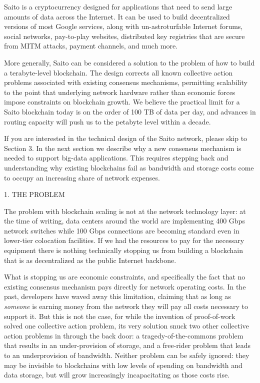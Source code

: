 \documentclass[11.5pt, oneside]{article}   	%
\begin{document}
\begin{multicols}{2}
Saito is a cryptocurrency designed for applications that need to send large amounts of data across the Internet. It can be used to build decentralized versions of most Google services, along with un-astroturfable Internet forums, social networks, pay-to-play websites, distributed key registries that are secure from MITM attacks, payment channels, and much more.

More generally, Saito can be considered a solution to the problem of how to build a terabyte-level blockchain. The design corrects all known collective action problems associated with existing consensus mechanisms, permitting scalability to the point that underlying network hardware rather than economic forces impose constraints on blockchain growth. We believe the practical limit for a Saito blockchain today is on the order of 100 TB of data per day, and advances in routing capacity will push us to the petabyte level within a decade.

If you are interested in the technical design of the Saito network, please skip to Section 3. In the next section we describe why a new consensus mechanism is needed to support big-data applications. This requires stepping back and understanding why existing blockchains fail as bandwidth and storage costs come to occupy an increasing share of network expenses.


1. THE PROBLEM

The problem with blockchain scaling is not at the network technology layer: at the time of writing, data centers around the world are implementing 400 Gbps network switches while 100 Gbps connections are becoming standard even in lower-tier colocation facilities. If we had the resources to pay for the necessary equipment there is nothing technically stopping us from building a blockchain that is as decentralized as the public Internet backbone.

What is stopping us are economic constraints, and specifically the fact that no existing consensus mechanism pays directly for network operating costs. In the past, developers have waved away this limitation, claiming that as long as {\textit{someone}} is earning money from the network they will pay all costs necessary to support it. But this is not the case, for while the invention of proof-of-work solved one collective action problem, its very solution snuck two other collective action problems in through the back door: a tragedy-of-the-commons problem that results in an under-provision of  storage, and a free-rider problem that leads to an underprovision of bandwidth. Neither problem can be safely ignored: they may be invisible to blockchains with low levels of spending on bandwidth and data storage, but will grow increasingly incapacitating as those costs rise.


\end{multicols}
\end{document}
